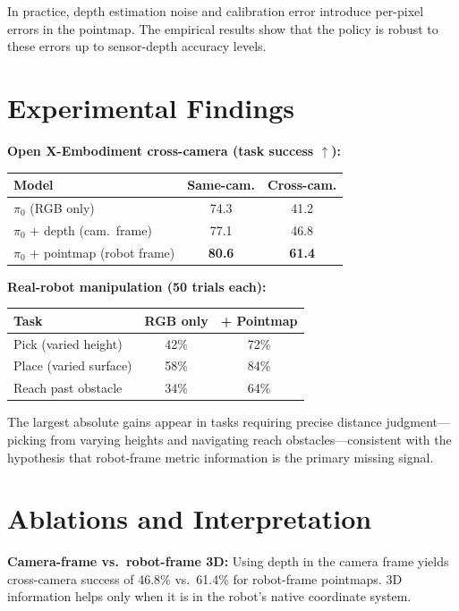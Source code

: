 \documentclass[10pt,twocolumn]{article}
\begin{document}
In practice, depth estimation noise and calibration error
introduce per-pixel errors in the pointmap. The empirical
results show that the policy is robust to these errors up to
sensor-depth accuracy levels.

\section{Experimental Findings}

\textbf{Open X-Embodiment cross-camera (task success $\uparrow$):}

\begin{center}\small
\begin{tabular}{lcc}
\toprule
Model & Same-cam. & Cross-cam. \\
\midrule
$\pi_0$ (RGB only) & 74.3 & 41.2 \\
$\pi_0$ + depth (cam.\ frame) & 77.1 & 46.8 \\
$\pi_0$ + pointmap (robot frame) & \textbf{80.6} & \textbf{61.4} \\
\bottomrule
\end{tabular}
\end{center}

\textbf{Real-robot manipulation (50 trials each):}

\begin{center}\small
\begin{tabular}{lcc}
\toprule
Task & RGB only & + Pointmap \\
\midrule
Pick (varied height) & 42\% & 72\% \\
Place (varied surface) & 58\% & 84\% \\
Reach past obstacle & 34\% & 64\% \\
\bottomrule
\end{tabular}
\end{center}

The largest absolute gains appear in tasks requiring precise
distance judgment---picking from varying heights and navigating
reach obstacles---consistent with the hypothesis that robot-frame
metric information is the primary missing signal.

\section{Ablations and Interpretation}

\textbf{Camera-frame vs.\ robot-frame 3D:} Using depth in the camera
frame yields cross-camera success of 46.8\% vs.\ 61.4\% for
robot-frame pointmaps. 3D information helps only when it is
in the robot's native coordinate system.
\end{document}
